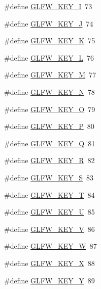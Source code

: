 \begin{DoxyCompactItemize}
\#define \mbox{\hyperlink{group__keys_ga274655c8bfe39742684ca393cf8ed093}{G\+L\+F\+W\+\_\+\+K\+E\+Y\+\_\+I}}~73
\item 
\#define \mbox{\hyperlink{group__keys_ga65ff2aedb129a3149ad9cb3e4159a75f}{G\+L\+F\+W\+\_\+\+K\+E\+Y\+\_\+J}}~74
\item 
\#define \mbox{\hyperlink{group__keys_ga4ae8debadf6d2a691badae0b53ea3ba0}{G\+L\+F\+W\+\_\+\+K\+E\+Y\+\_\+K}}~75
\item 
\#define \mbox{\hyperlink{group__keys_gaaa8b54a13f6b1eed85ac86f82d550db2}{G\+L\+F\+W\+\_\+\+K\+E\+Y\+\_\+L}}~76
\item 
\#define \mbox{\hyperlink{group__keys_ga4d7f0260c82e4ea3d6ebc7a21d6e3716}{G\+L\+F\+W\+\_\+\+K\+E\+Y\+\_\+M}}~77
\item 
\#define \mbox{\hyperlink{group__keys_gae00856dfeb5d13aafebf59d44de5cdda}{G\+L\+F\+W\+\_\+\+K\+E\+Y\+\_\+N}}~78
\item 
\#define \mbox{\hyperlink{group__keys_gaecbbb79130df419d58dd7f09a169efe9}{G\+L\+F\+W\+\_\+\+K\+E\+Y\+\_\+O}}~79
\item 
\#define \mbox{\hyperlink{group__keys_ga8fc15819c1094fb2afa01d84546b33e1}{G\+L\+F\+W\+\_\+\+K\+E\+Y\+\_\+P}}~80
\item 
\#define \mbox{\hyperlink{group__keys_gafdd01e38b120d67cf51e348bb47f3964}{G\+L\+F\+W\+\_\+\+K\+E\+Y\+\_\+Q}}~81
\item 
\#define \mbox{\hyperlink{group__keys_ga4ce6c70a0c98c50b3fe4ab9a728d4d36}{G\+L\+F\+W\+\_\+\+K\+E\+Y\+\_\+R}}~82
\item 
\#define \mbox{\hyperlink{group__keys_ga1570e2ccaab036ea82bed66fc1dab2a9}{G\+L\+F\+W\+\_\+\+K\+E\+Y\+\_\+S}}~83
\item 
\#define \mbox{\hyperlink{group__keys_ga90e0560422ec7a30e7f3f375bc9f37f9}{G\+L\+F\+W\+\_\+\+K\+E\+Y\+\_\+T}}~84
\item 
\#define \mbox{\hyperlink{group__keys_gacad52f3bf7d378fc0ffa72a76769256d}{G\+L\+F\+W\+\_\+\+K\+E\+Y\+\_\+U}}~85
\item 
\#define \mbox{\hyperlink{group__keys_ga22c7763899ecf7788862e5f90eacce6b}{G\+L\+F\+W\+\_\+\+K\+E\+Y\+\_\+V}}~86
\item 
\#define \mbox{\hyperlink{group__keys_gaa06a712e6202661fc03da5bdb7b6e545}{G\+L\+F\+W\+\_\+\+K\+E\+Y\+\_\+W}}~87
\item 
\#define \mbox{\hyperlink{group__keys_gac1c42c0bf4192cea713c55598b06b744}{G\+L\+F\+W\+\_\+\+K\+E\+Y\+\_\+X}}~88
\item 
\#define \mbox{\hyperlink{group__keys_gafd9f115a549effdf8e372a787c360313}{G\+L\+F\+W\+\_\+\+K\+E\+Y\+\_\+Y}}~89

\end{DoxyCompactItemize}
